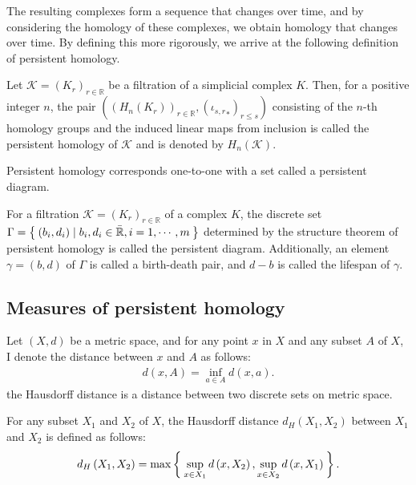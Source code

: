 \documentclass[dvipdfmx,11pt,notheorems]{article}
\begin{document}
The resulting complexes form a sequence that changes over time, and by considering the homology of these complexes, we obtain homology that changes over time. By defining this more rigorously, we arrive at the following definition of persistent homology.

\begin{dfn}
  Let $\mathcal{K} = \left( K_r \right)_{r\in\mathbb{R}}$ be a filtration of a simplicial complex $K$. Then, for a positive integer $n$, the pair $\left( \left( H_n\left( K_r \right) \right)_{r\in\mathbb{R}}, \left( {\iota_{s, r}}_* \right)_{r\leq s} \right)$ consisting of the $n$-th homology groups and the induced linear maps from inclusion is called the persistent homology of $\mathcal{K}$ and is denoted by $H_n\left( \mathcal{K} \right)$.
\end{dfn}

Persistent homology corresponds one-to-one with a set called a persistent diagram.

\begin{dfn}
  For a filtration $\mathcal{K} = \left( K_r \right)_{r\in\mathbb{R}}$ of a complex $K$, the discrete set $\Gamma = \Set{\left( b_i, d_i \right) \mid b_i, d_i \in \bar{\mathbb{R}}, i = 1, \cdots, m}$ determined by the structure theorem of persistent homology is called the persistent diagram. Additionally, an element $\gamma = \left( b, d \right)$ of $\Gamma$ is called a birth-death pair, and $d - b$ is called the lifespan of $\gamma$.
\end{dfn}

\subsection{Measures of persistent homology}

Let $\left( X, d \right)$ be a metric space, and for any point $x$ in $X$ and any subset $A$ of $X$, I denote the distance between $x$ and $A$ as follows:
\begin{align*}
  d\left( x, A \right) = \inf_{a \in A} d\left( x, a \right).
\end{align*}
the Hausdorff distance is a distance between two discrete sets on metric space.

\begin{dfn}
  For any subset $X_1$ and $X_2$ of $X$, the Hausdorff distance $d_H\left( X_1, X_2 \right)$ between $X_1$ and $X_2$ is defined as follows:
  \begin{align*}
    d_H\left( X_1, X_2 \right) = \max\Set{ \sup_{x\in X_1} d\left( x, X_2 \right), \sup_{x\in X_2} d\left( x, X_1 \right) }.
  \end{align*}
\end{dfn}
\end{document}
